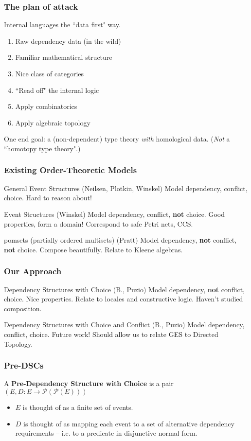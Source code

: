 \documentclass{beamer}
\newcommand{\Pc}{\mathcal{P}}
\begin{document}
\begin{frame}
\frametitle{The plan of attack}
Internal languages the ``data first" way.
\begin{enumerate}
\item Raw dependency data (in the wild)
\item Familiar mathematical structure
\item Nice class of categories
\item ``Read off" the internal logic
\item Apply combinatorics
\item Apply algebraic topology
\end{enumerate}
One end goal: a (non-dependent) type theory \textit{with} homological data. (\textit{Not} a ``homotopy type theory".)
\end{frame}


\begin{frame}
\frametitle{Existing Order-Theoretic Models}
\begin{block}{General Event Structures (Neilsen, Plotkin, Winskel)}
Model dependency, conflict, choice. Hard to reason about!
\end{block}
\begin{block}{Event Structures (Winskel)}
Model dependency, conflict, \textbf{not} choice. Good properties, form a domain! Correspond to safe Petri nets, CCS.
\end{block}
\begin{block}{pomsets (partially ordered multisets) (Pratt)}
Model dependency, \textbf{not} conflict, \textbf{not} choice. Compose beautifully. Relate to Kleene algebras.
\end{block}
\end{frame}

\begin{frame}
\frametitle{Our Approach}
\begin{block}{Dependency Structures with Choice (B., Puzio)}
Model dependency, \textbf{not} conflict, choice. Nice properties. Relate to locales and constructive logic. Haven't studied composition.
\end{block}
\begin{block}{Dependency Structures with Choice and Conflict (B., Puzio)}
Model dependency, conflict, choice. Future work! Should allow us to relate GES to Directed Topology.
\end{block}
\end{frame}

\begin{frame}
\frametitle{Pre-DSCs}
\begin{definition}
A \textbf{Pre-Dependency Structure with Choice} is a pair \((E, D : E \rightarrow \Pc(\Pc(E)))\) \end{definition}
\begin{itemize}
\item \(E\) is thought of as a finite set of events.
\item \(D\) is thought of as mapping each event to a set of alternative dependency requirements -- i.e. to a predicate in disjunctive normal form.
\end{itemize}
\end{frame}
\end{document}
